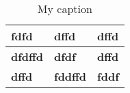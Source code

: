 \documentclass[12pt,oneside]{article}
\begin{document}
 



\begin{table}[]
\centering
\caption{My caption}
\label{my-label}
\begin{tabular}{|l|l|l|}
\hline
\rowcolor[HTML]{9B9B9B} 
fdfd                                 & dffd            & dffd          \\ \hline
\rowcolor[HTML]{FFFC9E} 
\textbf{dfdffd}                      & \textbf{dfdf}   & \textbf{dffd} \\ \hline
{\color[HTML]{FFCC67} \textbf{dffd}} & \textbf{fddffd} & \textbf{fddf} \\ \hline
\end{tabular}
\end{table}
\end{document}

